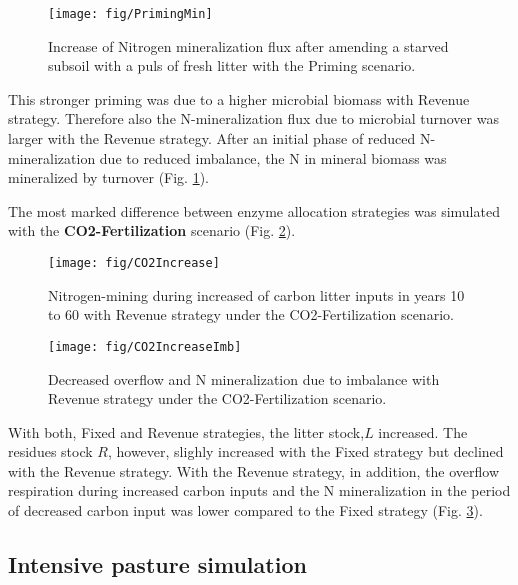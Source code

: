 \begin{figure}[t]
\vspace*{2mm}
\begin{center}
\texttt{[image: fig/PrimingMin]}
\end{center}
\caption{Increase of Nitrogen mineralization flux after amending a starved
subsoil with a puls of fresh litter with the Priming scenario.
\label{fig:PrimingMin}}
\end{figure}

This stronger priming was due to a higher microbial biomass with Revenue
strategy. Therefore also the N-mineralization flux due to microbial turnover
was larger with the Revenue strategy. After an initial phase of reduced
N-mineralization due to reduced imbalance, the N in mineral biomass was
mineralized by turnover (Fig. \ref{fig:PrimingMin}).

The most marked difference between enzyme allocation strategies was simulated
with the \textbf{CO2-Fertilization} scenario (Fig. \ref{fig:CO2Increase}).
\begin{figure}[t]
\vspace*{2mm}
\begin{center}
\texttt{[image: fig/CO2Increase]}
\end{center}
\caption{Nitrogen-mining during increased of carbon litter inputs in years 10
to 60 with Revenue strategy under the CO2-Fertilization scenario.
\label{fig:CO2Increase}}

\end{figure}
\begin{figure}[t] \vspace*{2mm}
\begin{center}
\texttt{[image: fig/CO2IncreaseImb]}
\end{center}
\caption{Decreased overflow and N mineralization due to imbalance with Revenue 
strategy under the CO2-Fertilization scenario.
\label{fig:CO2IncreaseImb}}
\end{figure}
With both, Fixed and Revenue strategies, the litter stock,$L$ increased. The
residues stock $R$, however, slighly increased with the Fixed strategy but
declined with the Revenue strategy. With the Revenue strategy, in addition, the
overflow respiration during increased carbon inputs and the N mineralization
in the period of decreased carbon input was lower compared to the Fixed
strategy (Fig. \ref{fig:CO2IncreaseImb}).

\subsection{Intensive pasture simulation}

